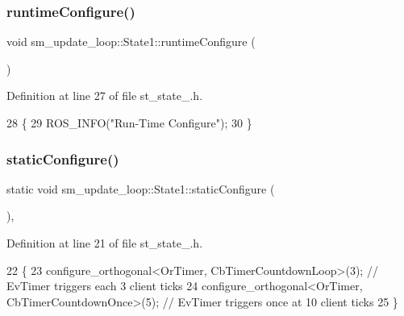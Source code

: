 \subsubsection{\texorpdfstring{runtime\+Configure()}{runtimeConfigure()}}
{\footnotesize\ttfamily void sm\+\_\+update\+\_\+loop\+::\+State1\+::runtime\+Configure (\begin{DoxyParamCaption}{ }\end{DoxyParamCaption})\hspace{0.3cm}{\ttfamily [inline]}}



Definition at line 27 of file st\+\_\+state\+\_.\+h.


\begin{DoxyCode}
28     \{
29         ROS\_INFO(\textcolor{stringliteral}{"Run-Time Configure"});
30     \}
\end{DoxyCode}
\mbox{\label{structsm__update__loop_1_1State1_a54b1ae508eb3d814fb2d811d78298b0e}} 
\subsubsection{\texorpdfstring{static\+Configure()}{staticConfigure()}}
{\footnotesize\ttfamily static void sm\+\_\+update\+\_\+loop\+::\+State1\+::static\+Configure (\begin{DoxyParamCaption}{ }\end{DoxyParamCaption})\hspace{0.3cm}{\ttfamily [inline]}, {\ttfamily [static]}}



Definition at line 21 of file st\+\_\+state\+\_.\+h.


\begin{DoxyCode}
22     \{
23         configure\_orthogonal<OrTimer, CbTimerCountdownLoop>(3); \textcolor{comment}{// EvTimer triggers each 3 client ticks}
24         configure\_orthogonal<OrTimer, CbTimerCountdownOnce>(5); \textcolor{comment}{// EvTimer triggers once at 10 client ticks}
25     \}
\end{DoxyCode}
\mbox{\label{structsm__update__loop_1_1State1_ad31e8291e9ca0d1a4d9dbb76d929c01e}} 
